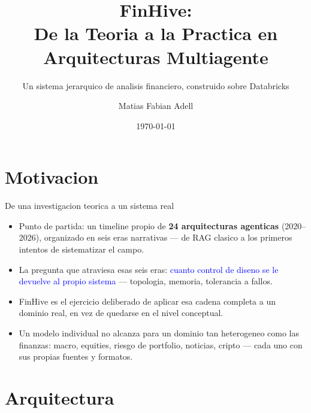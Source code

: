 \documentclass[11pt]{beamer}
\title[FinHive]{FinHive: \\ De la Teoria a la Practica en Arquitecturas Multiagente}
\subtitle{Un sistema jerarquico de analisis financiero, construido sobre Databricks}
\author{Matias Fabian Adell}
\institute{Portfolio project --- \url{github.com/matiasadell/finhive}}
\date{\today}
\newcommand{\hlb}[1]{\textcolor{blue}{#1}}
\begin{document}
\begin{frame}[plain]
    \maketitle
\end{frame}

\section{Motivacion}

\begin{frame}{De una investigacion teorica a un sistema real}
\begin{itemize}
    \item Punto de partida: un timeline propio de \textbf{24 arquitecturas agenticas}
    (2020--2026), organizado en seis eras narrativas --- de RAG clasico a los primeros
    intentos de sistematizar el campo.
    \item La pregunta que atraviesa esas seis eras: \hlb{cuanto control de diseno se le
    devuelve al propio sistema} --- topologia, memoria, tolerancia a fallos.
    \item FinHive es el ejercicio deliberado de aplicar esa cadena completa a un dominio
    real, en vez de quedarse en el nivel conceptual.
    \item Un modelo individual no alcanza para un dominio tan heterogeneo como las
    finanzas: macro, equities, riesgo de portfolio, noticias, cripto --- cada uno con
    sus propias fuentes y formatos.
\end{itemize}
\end{frame}

\section{Arquitectura}
\end{document}
